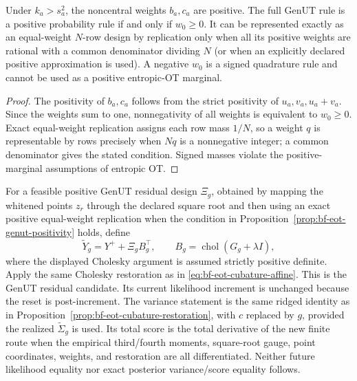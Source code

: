 \begin{proposition}
\label{prop:bf-eot-genut-positivity}
Under \(k_a>s_a^2\), the noncentral weights \(b_a,c_a\) are positive.  The
full GenUT rule is a positive probability rule if and only if
\(w_0\ge0\).  It can be represented exactly as an equal-weight \(N\)-row
design by replication only when all its positive weights are rational with a
common denominator dividing \(N\) (or when an explicitly declared positive
approximation is used).  A negative \(w_0\) is a signed quadrature rule and
cannot be used as a positive entropic-OT marginal.
\end{proposition}

\begin{proof}
The positivity of \(b_a,c_a\) follows from the strict positivity of
\(u_a,v_a,u_a+v_a\).  Since the weights sum to one, nonnegativity of all
weights is equivalent to \(w_0\ge0\).  Exact equal-weight replication assigns
each row mass \(1/N\), so a weight \(q\) is representable by rows precisely
when \(Nq\) is a nonnegative integer; a common denominator gives the stated
condition.  Signed masses violate the positive-marginal assumptions of
entropic OT.
\end{proof}

For a feasible positive GenUT residual design \(\Xi_g\), obtained by mapping the whitened points \(z_r\) through the declared square root and then using an exact positive equal-weight replication when the condition in Proposition~\ref{prop:bf-eot-genut-positivity} holds, define
\begin{equation}
 \widetilde Y_g=Y^++\Xi_gB_g^\top,
 \qquad B_g=\operatorname{chol}(G_g+\lambda I),
\end{equation}
where the displayed Cholesky argument is assumed strictly positive definite.
Apply the same Cholesky restoration as in
\eqref{eq:bf-eot-cubature-affine}.  This is the GenUT residual candidate.  Its
current likelihood increment is unchanged because the reset is post-increment.
The variance statement is the same ridged identity as in
Proposition~\ref{prop:bf-eot-cubature-restoration}, with \(c\) replaced by
\(g\), provided the realized \(\widetilde\Sigma_g\) is used.  Its total score is
the total derivative of the new finite route when the empirical
third/fourth moments, square-root gauge, point coordinates, weights, and
restoration are all differentiated.  Neither future likelihood equality nor
exact posterior variance/score equality follows.

